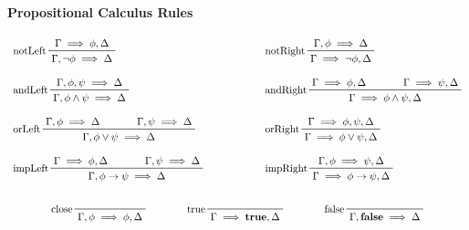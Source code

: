 		\paragraph{Propositional Calculus Rules}
			\begin{gather*}
				\begin{array}{lcl}
					\prftree[l]{notLeft}{\Gamma \implies \phi, \Delta}{\Gamma, \lnot\phi \implies \Delta}                                           & \quad\quad\quad\quad & \prftree[l]{notRight}{\Gamma, \phi \implies \Delta}{\Gamma \implies \lnot\phi, \Delta}                                             \\\\
					\prftree[l]{andLeft}{\Gamma, \phi, \psi \implies \Delta}{\Gamma, \phi \land \psi \implies \Delta}                               &                      & \prftree[l]{andRight}{\Gamma \implies \phi, \Delta}{\qquad}{\Gamma \implies \psi, \Delta}{\Gamma \implies \phi \land \psi, \Delta} \\\\
					\prftree[l]{orLeft}{\Gamma, \phi \implies \Delta}{\qquad}{\Gamma, \psi \implies \Delta}{\Gamma, \phi \lor \psi \implies \Delta} &                      & \prftree[l]{orRight}{\Gamma \implies \phi, \psi, \Delta}{\Gamma \implies \phi \lor \psi, \Delta}                                   \\\\
					\prftree[l]{impLeft}{\Gamma \implies \phi, \Delta}{\qquad}{\Gamma, \psi \implies \Delta}{\Gamma, \phi \to \psi \implies \Delta} &                      & \prftree[l]{impRight}{\Gamma, \phi \implies \psi, \Delta}{\Gamma \implies \phi \to \psi, \Delta}
				\end{array} \\\\
				\prftree[l]{close}{\Gamma, \phi \implies \phi, \Delta} \quad\quad\quad\quad \prftree[l]{true}{\Gamma \implies \textbf{true}, \Delta} \quad\quad\quad\quad \prftree[l]{false}{\Gamma, \textbf{false} \implies \Delta}
			\end{gather*}

